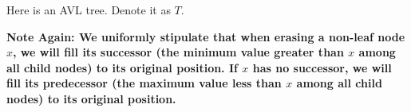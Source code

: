 
Here is an AVL tree. Denote it as $T$.

\textbf{Note Again: We uniformly stipulate that when erasing a non-leaf node $x$, we will fill its successor (the minimum value greater than $x$ among all child nodes) to its original position. If $x$ has no successor, we will fill its predecessor (the maximum value less than $x$ among all child nodes) to its original position.}

\begin{center}
\end{center}

